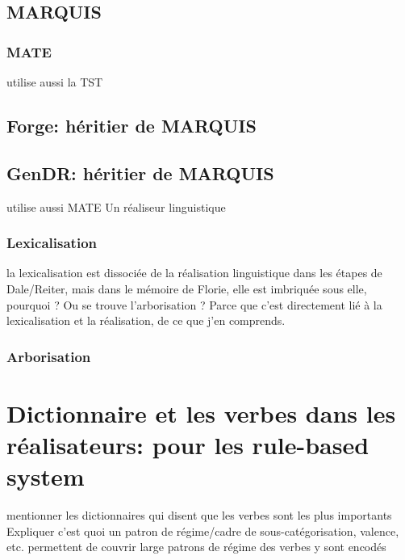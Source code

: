 \subsection{MARQUIS}
\subsubsection{MATE}
utilise aussi la TST

\subsection{Forge: héritier de MARQUIS}

\subsection{GenDR: héritier de MARQUIS}
utilise aussi MATE
Un réaliseur linguistique
\subsubsection{Lexicalisation}
la lexicalisation est dissociée de la réalisation linguistique dans les étapes de Dale/Reiter, mais dans le mémoire de Florie, elle est imbriquée sous elle, pourquoi ?
Ou se trouve l'arborisation ? Parce que c'est directement lié à la lexicalisation et la réalisation, de ce que j'en comprends.

\subsubsection{Arborisation}

\section{Dictionnaire et les verbes dans les réalisateurs: pour les rule-based system}

mentionner les dictionnaires qui disent que les verbes sont les plus importants
Expliquer c'est quoi un patron de régime/cadre de sous-catégorisation, valence, etc.
permettent de couvrir large
patrons de régime des verbes y sont encodés
